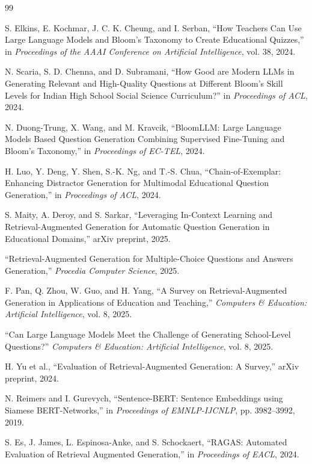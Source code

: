 \documentclass[12pt,a4paper]{report}
\begin{document}
\begin{thebibliography}{99}

S. Elkins, E. Kochmar, J. C. K. Cheung, and I. Serban,
``How Teachers Can Use Large Language Models and Bloom's Taxonomy to Create Educational Quizzes,''
in \textit{Proceedings of the AAAI Conference on Artificial Intelligence}, vol. 38, 2024.

N. Scaria, S. D. Chenna, and D. Subramani,
``How Good are Modern LLMs in Generating Relevant and High-Quality Questions at Different Bloom's Skill Levels for Indian High School Social Science Curriculum?''
in \textit{Proceedings of ACL}, 2024.

N. Duong-Trung, X. Wang, and M. Kravcik,
``BloomLLM: Large Language Models Based Question Generation Combining Supervised Fine-Tuning and Bloom's Taxonomy,''
in \textit{Proceedings of EC-TEL}, 2024.

H. Luo, Y. Deng, Y. Shen, S.-K. Ng, and T.-S. Chua,
``Chain-of-Exemplar: Enhancing Distractor Generation for Multimodal Educational Question Generation,''
in \textit{Proceedings of ACL}, 2024.

S. Maity, A. Deroy, and S. Sarkar,
``Leveraging In-Context Learning and Retrieval-Augmented Generation for Automatic Question Generation in Educational Domains,''
arXiv preprint, 2025.

``Retrieval-Augmented Generation for Multiple-Choice Questions and Answers Generation,''
\textit{Procedia Computer Science}, 2025.

F. Pan, Q. Zhou, W. Guo, and H. Yang,
``A Survey on Retrieval-Augmented Generation in Applications of Education and Teaching,''
\textit{Computers \& Education: Artificial Intelligence}, vol. 8, 2025.

``Can Large Language Models Meet the Challenge of Generating School-Level Questions?''
\textit{Computers \& Education: Artificial Intelligence}, vol. 8, 2025.

H. Yu et al.,
``Evaluation of Retrieval-Augmented Generation: A Survey,''
arXiv preprint, 2024.

N. Reimers and I. Gurevych,
``Sentence-BERT: Sentence Embeddings using Siamese BERT-Networks,''
in \textit{Proceedings of EMNLP-IJCNLP}, pp. 3982--3992, 2019.

S. Es, J. James, L. Espinosa-Anke, and S. Schockaert,
``RAGAS: Automated Evaluation of Retrieval Augmented Generation,''
in \textit{Proceedings of EACL}, 2024.


\end{thebibliography}
\end{document}

